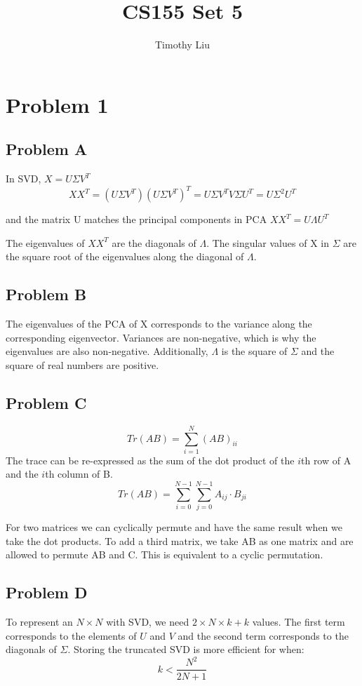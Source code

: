 \documentclass[12pt]{article} %
\title{CS155 Set 5}
\author{Timothy Liu}
\begin{document}
\maketitle

\newpage

\section{Problem 1}
\subsection{Problem A}

In SVD, $X = U\Sigma V^T$
$$XX^T = (U\Sigma V^T)(U \Sigma V^T)^T = U\Sigma V^T V \Sigma U^T = U \Sigma ^2 U^T$$

and the matrix U matches the principal components in PCA $XX^T = U\Lambda U^T$

The eigenvalues of $XX^T$ are the diagonals of $\Lambda$. The singular values of X in $\Sigma$ are the square root of the eigenvalues along the diagonal of $\Lambda$.

\subsection{Problem B}
The eigenvalues of the PCA of X corresponds to the variance along the corresponding eigenvector. Variances are non-negative, which is why the eigenvalues are also non-negative. Additionally, $\Lambda$ is the square of $\Sigma$ and the square of real numbers are positive. 

\subsection{Problem C}

$$Tr(AB) = \sum_{i = 1}^N (AB)_{ii}$$
The trace can be re-expressed as the sum of the dot product of the $i$th row of A and the $i$th column of B.
$$Tr(AB) = \sum_{i = 0}^{N-1} \sum_{j=0} ^{N-1} A_{ij} \cdot B_{ji} $$

For two matrices we can cyclically permute and have the same result when we take the dot products. To add a third matrix, we take AB as one matrix and are allowed to permute AB and C. This is equivalent to a cyclic permutation.

\subsection{Problem D}
To represent an $N \times N$ with SVD, we need $2 \times N \times k + k$ values. The first term corresponds to the elements of $U$ and $V$ and the second term corresponds to the diagonals of $\Sigma$. Storing the truncated SVD is more efficient for when:
$$k < \frac{N^2}{2N + 1}$$
\end{document}
